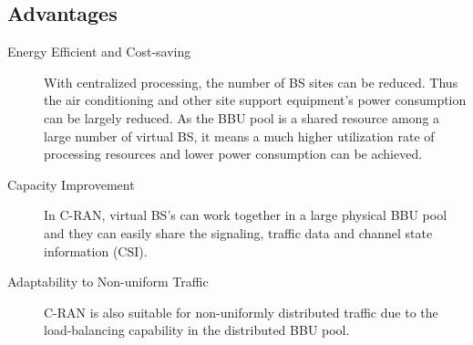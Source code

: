 \documentclass{article}
\begin{document}
\subsection{Advantages}

\begin{description}
    
    \item [Energy Efficient and Cost-saving] With centralized processing, 
    the number of BS 
    sites can be reduced. Thus the air conditioning and other site support 
    equipment's power consumption can be largely reduced. As the BBU pool 
    is a shared resource among a large number of virtual BS, it means a 
    much higher utilization rate of processing resources and lower power 
    consumption can be achieved.
    
    \item [Capacity Improvement] In C-RAN, virtual BS's can work together 
    in a large physical BBU pool and they can easily share the signaling, 
    traffic data and channel state information (CSI). 
    
    \item [Adaptability to Non-uniform Traffic] C-RAN is also suitable for 
    non-uniformly distributed traffic due to the load-balancing
    capability in the distributed BBU pool.
    
\end{description}




\printbibliography[heading=subbibliography]
\end{document}
